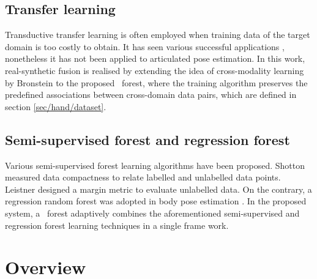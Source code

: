 \subsection{Transfer learning} 
Transductive transfer learning is often employed when training data of the target domain is too costly to obtain. 
It has seen various successful applications \cite{Pan2010}, nonetheless it has not been applied to articulated pose estimation. 
In this work, real-synthetic fusion is realised by extending the idea of cross-modality learning by Bronstein \etal \cite{Bronstein2010} to the proposed \STR\ forest, where the training algorithm preserves the predefined associations between cross-domain data pairs, which are defined in section \ref{sec/hand/dataset}.  

\subsection{Semi-supervised forest and regression forest} 
Various semi-supervised forest learning algorithms have been proposed. Shotton \etal \cite{Shotton2013} measured data compactness to relate labelled and unlabelled data points. Leistner \etal \cite{Leistner2009} designed a margin metric to evaluate unlabelled data. On the contrary, a regression random forest was adopted in body pose estimation \cite{Girshick2011, Sun2012}. In the proposed system, a \STR\ forest adaptively combines the aforementioned semi-supervised and regression forest learning techniques in a single frame work.

\section{Overview}

